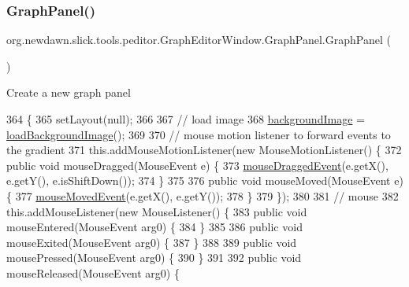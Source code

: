 \subsubsection{\texorpdfstring{Graph\+Panel()}{GraphPanel()}}
{\footnotesize\ttfamily org.\+newdawn.\+slick.\+tools.\+peditor.\+Graph\+Editor\+Window.\+Graph\+Panel.\+Graph\+Panel (\begin{DoxyParamCaption}{ }\end{DoxyParamCaption})\hspace{0.3cm}{\ttfamily [inline]}}

Create a new graph panel 
\begin{DoxyCode}
364                             \{
365             setLayout(null);
366 
367             \textcolor{comment}{// load image}
368             \mbox{\hyperlink{classorg_1_1newdawn_1_1slick_1_1tools_1_1peditor_1_1_graph_editor_window_1_1_graph_panel_a281be1220a55ccb509f7c25f34bf6740}{backgroundImage}} = \mbox{\hyperlink{classorg_1_1newdawn_1_1slick_1_1tools_1_1peditor_1_1_graph_editor_window_1_1_graph_panel_a0a618208e96ff3832ef090bf9b38843a}{loadBackgroundImage}}();
369 
370             \textcolor{comment}{// mouse motion listener to forward events to the gradient}
371             this.addMouseMotionListener(\textcolor{keyword}{new} MouseMotionListener() \{
372                 \textcolor{keyword}{public} \textcolor{keywordtype}{void} mouseDragged(MouseEvent e) \{
373                     \mbox{\hyperlink{classorg_1_1newdawn_1_1slick_1_1tools_1_1peditor_1_1_graph_editor_window_1_1_graph_panel_a919b8141a6fcc02c730ef42efc395e8b}{mouseDraggedEvent}}(e.getX(), e.getY(), e.isShiftDown());
374                 \}
375 
376                 \textcolor{keyword}{public} \textcolor{keywordtype}{void} mouseMoved(MouseEvent e) \{
377                     \mbox{\hyperlink{classorg_1_1newdawn_1_1slick_1_1tools_1_1peditor_1_1_graph_editor_window_1_1_graph_panel_a07bb6aa0290d522eeca396a8aa39905f}{mouseMovedEvent}}(e.getX(), e.getY());
378                 \}
379             \});
380 
381             \textcolor{comment}{// mouse}
382             this.addMouseListener(\textcolor{keyword}{new} MouseListener() \{
383                 \textcolor{keyword}{public} \textcolor{keywordtype}{void} mouseEntered(MouseEvent arg0) \{
384                 \}
385 
386                 \textcolor{keyword}{public} \textcolor{keywordtype}{void} mouseExited(MouseEvent arg0) \{
387                 \}
388 
389                 \textcolor{keyword}{public} \textcolor{keywordtype}{void} mousePressed(MouseEvent arg0) \{
390                 \}
391 
392                 \textcolor{keyword}{public} \textcolor{keywordtype}{void} mouseReleased(MouseEvent arg0) \{

\end{DoxyCode}
